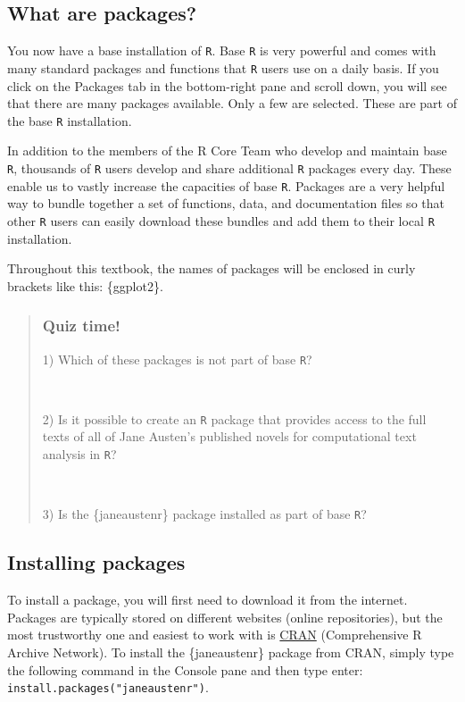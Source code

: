 \documentclass[
  letterpaper,
  DIV=11,
  numbers=noendperiod]{scrreprt}
\begin{document}
\subsection{What are packages?}\label{what-are-packages}

You now have a base installation of \texttt{R}. Base \texttt{R} is very
powerful and comes with many standard packages and functions that
\texttt{R} users use on a daily basis. If you click on the Packages tab
in the bottom-right pane and scroll down, you will see that there are
many packages available. Only a few are selected. These are part of the
base \texttt{R} installation.

In addition to the members of the R Core Team who develop and maintain
base \texttt{R}, thousands of \texttt{R} users develop and share
additional \texttt{R} packages every day. These enable us to vastly
increase the capacities of base \texttt{R}. Packages are a very helpful
way to bundle together a set of functions, data, and documentation files
so that other \texttt{R} users can easily download these bundles and add
them to their local \texttt{R} installation.

Throughout this textbook, the names of packages will be enclosed in
curly brackets like this: \{ggplot2\}.

\begin{quote}
\subsubsection*{Quiz time!}\label{quiz-time-3}

1) Which of these packages is not part of base \texttt{R}?

~

2) Is it possible to create an \texttt{R} package that provides access
to the full texts of all of Jane Austen's published novels for
computational text analysis in \texttt{R}?

~

3) Is the \{janeaustenr\} package installed as part of base \texttt{R}?
\end{quote}

\subsection{Installing packages}\label{installing-packages}

To install a package, you will first need to download it from the
internet. Packages are typically stored on different websites (online
repositories), but the most trustworthy one and easiest to work with is
\href{https://cran.rstudio.com/index.html}{CRAN} (Comprehensive R
Archive Network). To install the \{janeaustenr\} package from CRAN,
simply type the following command in the Console pane and then type
enter: \texttt{install.packages("janeaustenr")}.
\end{document}
